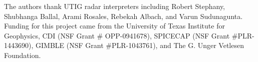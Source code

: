 \documentclass[draft,jgrga]{statclim}
\begin{document}
\begin{article}

%
%
%

%	
%
%
%
%

\begin{acknowledgments}
The authors thank UTIG radar interpreters including Robert Stephany, Shubhanga Ballal, Arami Rosales, Rebekah Albach, and Varun Sudunagunta. Funding for this project came from the University of Texas Institute for Geophysics, CDI (NSF Grant \# OPP-0941678), SPICECAP (NSF Grant \#PLR-1443690), GIMBLE (NSF Grant \#PLR-1043761), and The G.  Unger Vetlesen Foundation. 
\end{acknowledgments}

%
%
%
%
%
%
%
%
%


\end{article}
\end{document}
